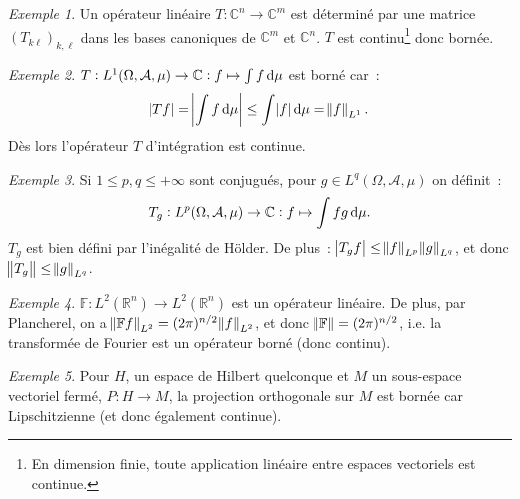 \documentclass{report}
\newcommand{\C}{{\mathbb C}}
\newcommand{\R}{{\mathbb R}}
\newcommand{\pinfty}{{+\infty}}
\theoremstyle{definition}
\theoremstyle{remark}
\newtheorem{ex}{Exemple}[chapter]
\begin{document}
\begin{ex}
Un opérateur linéaire $T : \C^n \to \C^m$ est déterminé par une matrice $(T_{k\ell})_{k,\ell}$ dans les bases canoniques de $\C^m$ et $\C^n$.
$T$ est continu\footnote{En dimension finie, toute application linéaire entre espaces vectoriels est continue.} donc bornée.
\end{ex}

\begin{ex}
$T : L^1(\Omega, \mathcal A, \mu) \to \C : f \mapsto \int f\dif\mu$ est borné car~:
\[\abs {Tf} = \abs {\int f\dif\mu} \leq \int\abs f\dif\mu = \norm f_{L^1}.\]
Dès lors l'opérateur $T$ d'intégration est continue.
\end{ex}

\begin{ex}
Si $1 \leq p, q \leq \pinfty$ sont conjugués, pour $g \in L^q(\Omega, \mathcal A, \mu)$ on définit~:
\[T_g : L^p(\Omega, \mathcal A, \mu) \to \C : f \mapsto \int fg\dif\mu.\]
$T_g$ est bien défini par l'inégalité de Hölder. De plus~: $\abs {T_gf} \leq \norm f_{L^p}\norm g_{L^q}$, et donc $\norm {T_g} \leq \norm g_{L^q}$.
\end{ex}

\begin{ex}
$\mathbb F : L^2(\R^n) \to L^2(\R^n)$ est un opérateur linéaire. De plus, par Plancherel, on a $\norm {\mathbb Ff}_{L^2} = (2\pi)^{n/2}\norm f_{L^2}$,
et donc $\norm {\mathbb F} = (2\pi)^{n/2}$, i.e. la transformée de Fourier est un opérateur borné (donc continu).
\end{ex}

\begin{ex}
Pour $H$, un espace de Hilbert quelconque et $M$ un sous-espace vectoriel fermé, $P : H \to M$, la projection orthogonale sur $M$ est bornée car Lipschitzienne
(et donc également continue).
\end{ex}
\end{document}
